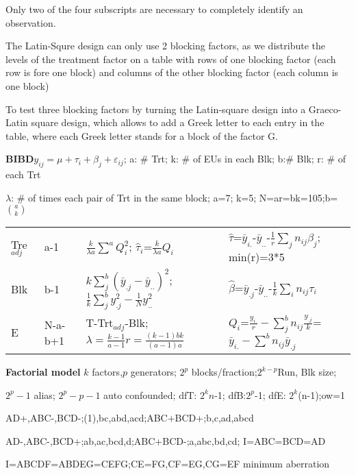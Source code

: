 \documentclass[
  10pt,
  twocolumn]{article}
\begin{document}
Only two of the four subscripts are necessary to completely identify an
observation.

The Latin-Squre design can only use 2 blocking factors, as we distribute
the levels of the treatment factor on a table with rows of one blocking
factor (each row is fore one block) and columns of the other blocking
factor (each column is one block)

To test three blocking factors by turning the Latin-square design into a
Graeco-Latin square design, which allows to add a Greek letter to each
entry in the table, where each Greek letter stands for a block of the
factor G.

\dotfill

\textbf{BIBD}\(y_{ij}=\mu+\tau_{i}+\beta_j+\varepsilon_{ij}\); a: \#
Trt; k: \# of EUs in each Blk; b:\# Blk; r: \# of each Trt

\(\lambda\): \# of times each pair of Trt in the same block; a=7; k=5;
N=ar=bk=105;b=\(\binom{a}{k}\)

\begin{tabular}{l|l|l|l}\hline
Tre$_{adj}$&a-1&$\frac{k}{\lambda a}\sum^aQ_i^2$; $\hat\tau_i$=$\frac{k}{\lambda a}Q_i$&$\hat{\tau}$=$\bar{y}_{i.}$-$\bar{y}_{..}$-$\frac{1}{r} \sum_j n_{ij}\beta_j$; min(r)=3*5\\
Blk  &b-1&$k\sum^b_{j}(\bar y_{.j}-\bar y_{..})^2$; $\frac1{k}\sum^b_{j} y_{.j}^2-\frac1{N}y_{..}^2$&$ \hat{\beta}$=$\bar{y}_{.j}$-$\bar{y}_{..}$-$\frac{1}{k} \sum_i n_{ij}\tau_i$\\
E&N-a-b+1&T-Trt$_{adj}$-Blk; $\lambda=\frac{k-1}{a-1}r=\frac{(k-1)bk}{(a-1)a}$&$Q_i$=$\frac{y_{i.}}r-\sum^b_jn_{ij} \frac{y_{.j}}k$= $\bar y_{i.}-\sum^bn_{ij}\bar y_{.j}$\\\hline
\end{tabular}

\textbf{Factorial model} \(k\) factors,\(p\) generators; \(2^p\)
blocks/fraction;\(2^{k-p}\)Run, Blk size;

\(2^p-1\) alias; \(2^p-p-1\) auto confounded; dfT: \(2^kn\)-1;
dfB:\(2^p\)-1; dfE: \(2^k\)(n-1);ow=1

AD+,ABC-,BCD-;(1),bc,abd,acd;ABC+BCD+;b,c,ad,abcd

AD-,ABC-,BCD+;ab,ac,bcd,d;ABC+BCD-;a,abc,bd,cd; I=ABC=BCD=AD

I=ABCDF=ABDEG=CEFG;CE=FG,CF=EG,CG=EF minimum aberration
\end{document}
